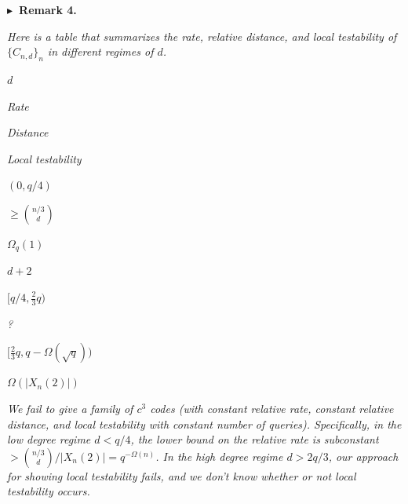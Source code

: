 



\par\medskip\noindent\textbf{
$\blacktriangleright$ Remark 4.
}\par



\emph{Here is a table that summarizes the rate, relative distance, and local testability of $\{C_{n,d}\}_{n}$ in different regimes of $d$.}\par









$d$

 


\emph{Rate}

 


\emph{Distance}

 


\emph{Local testability}

 
\par






$(0,q/4)$

 


\emph{$\geq{\binom{n/3}{d}}$}

 


\emph{$\Omega_{q}(1)$}

 


$d+2$

 
\par




$[q/4,\frac{2}{3}q)$

 


\emph{?}

 
\par




$[\frac{2}{3}q,q-\Omega(\sqrt{q}))$

 


$\Omega(\lvert X_{n}(2)\rvert)$

 
\par







\emph{We fail to give a family of $c^{3}$ codes (with constant relative rate, constant relative distance, and local testability with constant number of queries). Specifically, in the low degree regime $d<q/4$, the lower bound on the relative rate is subconstant $>{\binom{n/3}{d}}/\lvert X_{n}(2)\rvert=q^{-\Omega(n)}$. In the high degree regime $d>2q/3$, our approach for showing local testability fails, and we don’t know whether or not local testability occurs.}\par



